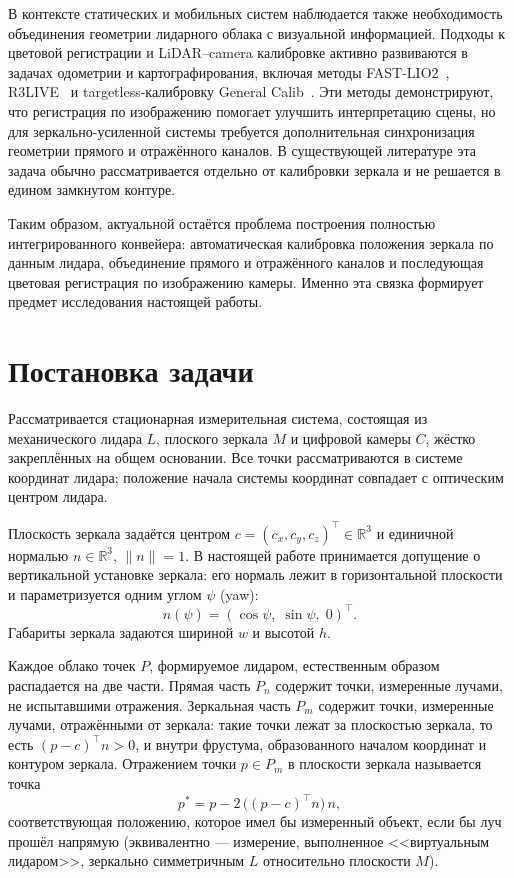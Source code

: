 \documentclass{misisarticle}
\begin{document}
В контексте статических и мобильных систем наблюдается также
необходимость объединения геометрии лидарного облака с визуальной
информацией. Подходы к цветовой регистрации и LiDAR--camera
калибровке активно развиваются в задачах одометрии и картографирования,
включая методы FAST-LIO2~\cite{fastlio2}, R3LIVE~\cite{r3live} и
targetless-калибровку General Calib~\cite{Koide2023GeneralCalib}.
Эти методы демонстрируют, что регистрация по изображению помогает
улучшить интерпретацию сцены, но для зеркально-усиленной системы
требуется дополнительная синхронизация геометрии прямого и отражённого
каналов. В существующей литературе эта задача обычно рассматривается
отдельно от калибровки зеркала и не решается в едином замкнутом
контуре.

Таким образом, актуальной остаётся проблема построения полностью
интегрированного конвейера: автоматическая калибровка положения
зеркала по данным лидара, объединение прямого и отражённого каналов
и последующая цветовая регистрация по изображению камеры. Именно
эта связка формирует предмет исследования настоящей работы.

\section{Постановка задачи}

Рассматривается стационарная измерительная система, состоящая из
механического лидара $L$, плоского зеркала $M$ и цифровой камеры $C$,
жёстко закреплённых на общем основании. Все точки рассматриваются в
системе координат лидара; положение начала системы координат совпадает
с оптическим центром лидара.

Плоскость зеркала задаётся центром
$c = (c_x, c_y, c_z)^{\top} \in \mathbb{R}^3$ и единичной нормалью
$n \in \mathbb{R}^3$, $\|n\| = 1$. В настоящей работе принимается
допущение о вертикальной установке зеркала: его нормаль лежит в
горизонтальной плоскости и параметризуется одним углом $\psi$ (yaw):
\begin{equation}
  n(\psi) = (\cos\psi,\; \sin\psi,\; 0)^{\top}.
  \label{eq:normal}
\end{equation}
Габариты зеркала задаются шириной $w$ и высотой $h$.

Каждое облако точек $P$, формируемое лидаром, естественным образом
распадается на две части. Прямая часть $P_n$ содержит точки, измеренные
лучами, не испытавшими отражения. Зеркальная часть $P_m$ содержит точки,
измеренные лучами, отражёнными от зеркала: такие точки лежат за
плоскостью зеркала, то есть $(p - c)^{\top} n > 0$, и внутри фрустума,
образованного началом координат и контуром зеркала. Отражением точки
$p \in P_m$ в плоскости зеркала называется точка
\begin{equation}
  p^{*} = p - 2\,\bigl((p - c)^{\top} n\bigr)\, n,
  \label{eq:reflect}
\end{equation}
соответствующая положению, которое имел бы измеренный объект, если бы
луч прошёл напрямую (эквивалентно — измерение, выполненное
<<виртуальным лидаром>>, зеркально симметричным $L$ относительно
плоскости $M$).
\end{document}
